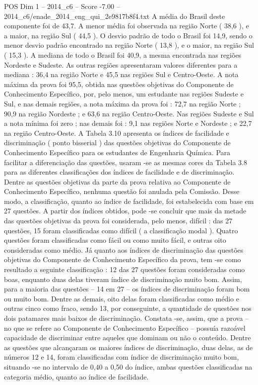 \begin{textsample}{POS Dim 1 – 2014\_c6 – Score -7.00 – 2014\_c6/enade\_2014\_eng\_qui\_2e9817b8f4.txt}
A média do Brasil deste componente foi de 43,7.
A menor média foi observada na região Norte ( 38,6 ), e a maior, na região Sul ( 44,5 ).
O desvio padrão de todo o Brasil foi 14,9, sendo o menor desvio padrão encontrado na região Norte ( 13,8 ), e o maior, na região Sul ( 15,3 ).
A mediana de todo o Brasil foi 40,9, a mesma encontrada nas regiões Nordeste e Sudeste.
As outras regiões apresentaram valores diferentes para a mediana : 36,4 na região Norte e 45,5 nas regiões Sul e Centro-Oeste.
A nota máxima da prova foi 95,5, obtida nas questões objetivas do Componente de Conhecimento Específico, por, pelo menos, um estudante nas regiões Sudeste e Sul, e nas demais regiões, a nota máxima da prova foi : 72,7 na região Norte ; 90,9 na região Nordeste ; e 63,6 na região Centro-Oeste.
Nas regiões Sudeste e Sul a nota mínima foi zero ; nas demais foi : 9,1 nas regiões Norte e Nordeste ; e 22,7 na região Centro-Oeste.
A Tabela 3.10 apresenta os índices de facilidade e discriminação ( ponto bisserial ) das questões objetivas do Componente de Conhecimento Específico para os estudantes de Engenharia Química.
Para facilitar a diferenciação das questões, usaram -se as mesmas cores da Tabela 3.8 para as diferentes classificações dos índices de facilidade e de discriminação.
Dentre as questões objetivas da parte da prova relativa ao Componente de Conhecimento Específico, nenhuma questão foi anulada pela Comissão.
Desse modo, a classificação, quanto ao índice de facilidade, foi estabelecida com base em 27 questões.
A partir dos índices obtidos, pode -se concluir que mais da metade das questões objetivas da prova foi considerada, pelo menos, difícil : das 27 questões, 15 foram classificadas como difícil ( a classificação modal ).
Quatro questões foram classificadas como fácil ou como muito fácil, e outras oito consideradas como médio.
Já quanto aos índices de discriminação das questões objetivas do Componente de Conhecimento Específico da prova, tem -se como resultado a seguinte classificação : 12 das 27 questões foram consideradas como boas, enquanto duas delas tiveram índice de discriminação muito bom.
Assim, para a maioria das questões – 14 em 27 – os índices de discriminação foram bom ou muito bom.
Dentre as demais, oito delas foram classificadas como médio e outras cinco como fraco, sendo 13, por conseguinte, a quantidade de questões nos dois patamares mais baixos de discriminação.
Constata -se, assim, que a prova – no que se refere ao Componente de Conhecimento Específico – possuía razoável capacidade de discriminar entre aqueles que dominam ou não o conteúdo.
Dentre as questões que alcançaram os maiores índices de discriminação, duas delas, as de números 12 e 14, foram classificadas com índice de discriminação muito bom, situando -se no intervalo de 0,40 a 0,50 do índice, ambas questões classificadas na categoria médio, quanto ao índice de facilidade.

\end{textsample}
